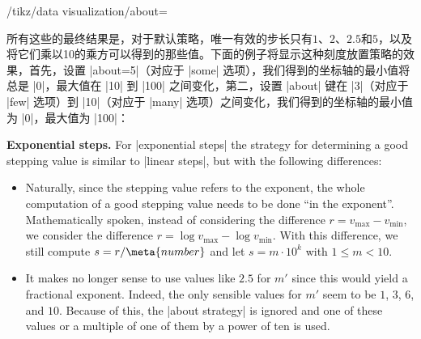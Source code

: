 \begin{key}{/tikz/data visualization/about=}
{
    }


    所有这些的最终结果是，对于默认策略，唯一有效的步长只有$1$、$2$、$2.5$和$5$，以及将它们乘以10的乘方可以得到的那些值。下面的例子将显示这种刻度放置策略的效果，首先，设置 |about=5|（对应于 |some| 选项），我们得到的坐标轴的最小值将总是 |0|，最大值在 |10| 到 |100| 之间变化，第二，设置 |about| 键在 |3|（对应于 |few| 选项）到 |10|（对应于 |many| 选项）之间变化，我们得到的坐标轴的最小值为 |0|，最大值为 |100|：


    \medskip
    \textbf{Exponential steps.}
    For |exponential steps| the strategy for determining a good stepping value is similar to |linear steps|, but with the following differences:
    \begin{itemize}
        \item Naturally, since the stepping value refers to the exponent, the whole computation of a good stepping value needs to be done ``in the exponent''. Mathematically spoken, instead of considering the difference $r = v_{\max} - v_{\min}$, we consider the difference $r = \log v_{\max} - \log v_{\min}$. With this difference, we still compute $s = r / \meta{number}$ and let $s = m \cdot 10^k$ with $1 \le m < 10$.
        \item It makes no longer sense to use values like $2.5$ for $m'$ since this would yield a fractional exponent. Indeed, the only sensible values for $m'$ seem to be $1$, $3$, $6$, and $10$. Because of this, the |about strategy| is ignored and one of these values or a multiple of one of them by a power of ten is used.
    \end{itemize}


\end{key}
